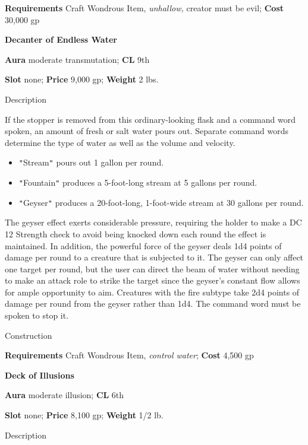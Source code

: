 \textbf{Requirements} Craft Wondrous Item, \textit{unhallow,} creator must be evil; \textbf{Cost }30,000 gp
				
\textbf{Decanter of Endless Water}
				
\textbf{Aura} moderate transmutation;\textbf{ CL }9th
				
\textbf{Slot} none; \textbf{Price} 9,000 gp; \textbf{Weight} 2 lbs.
				
Description
				
If the stopper is removed from this ordinary-looking flask and a command word spoken, an amount of fresh or salt water pours out. Separate command words determine the type of water as well as the volume and velocity.
\begin{itemize}\item  \texttt{{}"{}}Stream\texttt{{}"{}} pours out 1 gallon per round.
\item  \texttt{{}"{}}Fountain\texttt{{}"{}} produces a 5-foot-long stream at 5 gallons per round.
\item  \texttt{{}"{}}Geyser\texttt{{}"{}} produces a 20-foot-long, 1-foot-wide stream at 30 gallons per round.
\end{itemize}
				
The geyser effect exerts considerable pressure, requiring the holder to make a DC 12 Strength check to avoid being knocked down each round the effect is maintained. In addition, the powerful force of the geyser deals 1d4 points of damage per round to a creature that is subjected to it. The geyser can only affect one target per round, but the user can direct the beam of water without needing to make an attack role to strike the target since the geyser's constant flow allows for ample opportunity to aim. Creatures with the fire subtype take 2d4 points of damage per round from the geyser rather than 1d4. The command word must be spoken to stop it. 
				
Construction
				
\textbf{Requirements} Craft Wondrous Item, \textit{control water};\textbf{ Cost }4,500 gp
				
\textbf{Deck of Illusions}
				
\textbf{Aura} moderate illusion;\textbf{ CL }6th
				
\textbf{Slot} none; \textbf{Price} 8,100 gp; \textbf{Weight} 1/2 lb.
				
Description
				
